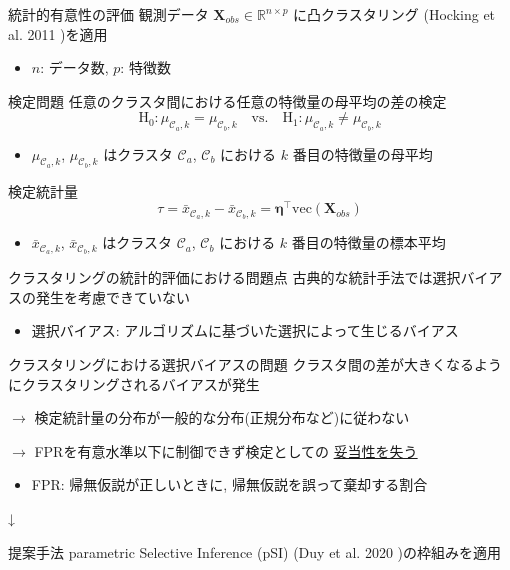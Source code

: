 \documentclass[dvipdfmx, 10pt]{beamer}
\newcommand{\ul}{\underline}
\newcommand{\zl}{\rightarrow}
\begin{document}
\begin{frame}{統計的有意性の評価}
    観測データ $\bm{X}_{obs} \in \mathbb{R}^{n \times p}$ に凸クラスタリング (Hocking et al. 2011 \cite{hocking2011clusterpath})を適用
    \begin{itemize}
        \item $n$: データ数, $p$: 特徴数
    \end{itemize}
    \begin{exampleblock}{検定問題}
        任意のクラスタ間における任意の特徴量の母平均の差の検定
        \[
            \text{H}_0: \mu_{\mathcal{C}_a, k} = \mu_{\mathcal{C}_b, k} \quad \text{vs.} \quad \text{H}_1: \mu_{\mathcal{C}_a, k} \neq \mu_{\mathcal{C}_b, k}
        \]
        \begin{itemize}
            \item $\mu_{\mathcal{C}_a, k}$, $\mu_{\mathcal{C}_b, k}$ はクラスタ $\mathcal{C}_a$, $\mathcal{C}_b$ における $k$ 番目の特徴量の母平均
        \end{itemize}
    \end{exampleblock}
    \begin{exampleblock}{検定統計量}
        \[
            \tau = \bar{x}_{\mathcal{C}_a, k} - \bar{x}_{\mathcal{C}_b, k} = \bm{\eta}^{\top} \mathrm{vec}(\bm{X}_{obs})
        \]
        \begin{itemize}  
            \item $\bar{x}_{\mathcal{C}_a, k}$, $\bar{x}_{\mathcal{C}_b, k}$ はクラスタ $\mathcal{C}_a$, $\mathcal{C}_b$ における $k$ 番目の特徴量の標本平均
        \end{itemize}
    \end{exampleblock}
\end{frame}


\begin{frame}{クラスタリングの統計的評価における問題点}
    古典的な統計手法では\alert{選択バイアス}の発生を考慮できていない
    \begin{itemize}
        \item 選択バイアス: アルゴリズムに基づいた選択によって生じるバイアス
    \end{itemize}
    \begin{alertblock}{クラスタリングにおける選択バイアスの問題}
        クラスタ間の差が大きくなるようにクラスタリングされるバイアスが発生
        
        $\zl$ 検定統計量の分布が一般的な分布(正規分布など)に従わない
        
        $\zl$ FPRを有意水準以下に制御できず検定としての \ul{妥当性を失う}
        \begin{itemize}
        \item FPR: 帰無仮説が正しいときに, 帰無仮説を誤って棄却する割合
        \end{itemize}
    \end{alertblock}
    \centering ↓
    \begin{block}{提案手法}
        parametric Selective Inference (pSI) (Duy et al. 2020 \cite{duy2020parametric})の枠組みを適用
    \end{block}
\end{frame}
\end{document}
